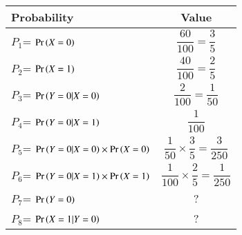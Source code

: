 \begin{tabular}{|l|c|}
	\hline
	\textbf{Probability} & \textbf{Value} \\
	\hline
	$P_1$= $\Pr\left(X=0\right)$ & $\dfrac{60}{100}=\dfrac{3}{5}$\\ 
	\hline
	$P_2$= $\Pr\left(X=1\right)$ & $\dfrac{40}{100}=\dfrac{2}{5}$\\
	\hline
	$P_3$= $\Pr\left(Y=0|X=0\right)$ & $\dfrac{2}{100}=\dfrac{1}{50}$\\ 
	\hline
	$P_4$= $\Pr\left(Y=0|X=1\right)$ & $\dfrac{1}{100}$\\ 
	\hline
	$P_5$= $\Pr\left(Y=0|X=0\right)\times\Pr\left(X=0\right)$ & $\dfrac{1}{50}\times\dfrac{3}{5}=\dfrac{3}{250}$\\ 
	\hline
	$P_6$= $\Pr\left(Y=0|X=1\right)\times\Pr\left(X=1\right)$ & $\dfrac{1}{100}\times\dfrac{2}{5}=\dfrac{1}{250}$\\ 
	\hline
	$P_7$= $\Pr\left(Y=0\right)$ & ? \\ 
	\hline
	$P_8$= $\Pr\left(X=1|Y=0\right)$ & ? \\ 
	\hline
\end{tabular}
